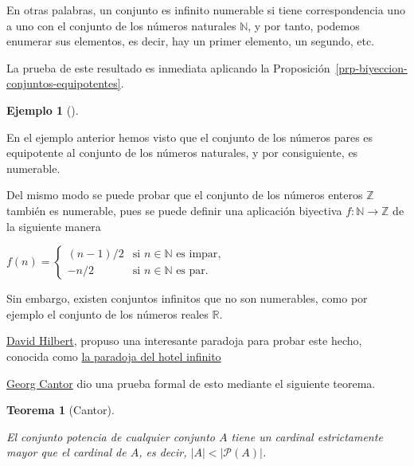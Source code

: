 \documentclass[
  a4paper,
]{scrreport}
\theoremstyle{plain}
\theoremstyle{plain}
\newtheorem{theorem}{Teorema}[chapter]
\theoremstyle{definition}
\theoremstyle{definition}
\newtheorem{example}{Ejemplo}[chapter]
\theoremstyle{plain}
\theoremstyle{definition}
\theoremstyle{remark}
\begin{document}
En otras palabras, un conjunto es infinito numerable si tiene
correspondencia uno a uno con el conjunto de los números naturales
\(\mathbb{N}\), y por tanto, podemos enumerar sus elementos, es decir,
hay un primer elemento, un segundo, etc.

La prueba de este resultado es inmediata aplicando la
Proposición~\ref{prp-biyeccion-conjuntos-equipotentes}.

\begin{example}[]\protect\hypertarget{exm-enteros-equipotentes-naturales}{}\label{exm-enteros-equipotentes-naturales}

En el ejemplo anterior hemos visto que el conjunto de los números pares
es equipotente al conjunto de los números naturales, y por consiguiente,
es numerable.

Del mismo modo se puede probar que el conjunto de los números enteros
\(\mathbb{Z}\) también es numerable, pues se puede definir una
aplicación biyectiva \(f:\mathbb{N}\rightarrow \mathbb{Z}\) de la
siguiente manera

\(f(n)= \begin{cases} (n-1)/2 &\mbox{si } n\in \mathbb{N} \mbox{ es impar},\\ -n/2 &\mbox{si } n\in \mathbb{N} \mbox{ es par}. \end{cases}\)

\end{example}

Sin embargo, existen conjuntos infinitos que no son numerables, como por
ejemplo el conjunto de los números reales \(\mathbb{R}\).

\href{https://es.wikipedia.org/wiki/David_Hilbert}{David Hilbert},
propuso una interesante paradoja para probar este hecho, conocida como
\href{https://www.youtube.com/watch?v=4c8vG-mxuao}{la paradoja del hotel
infinito}

\href{https://en.wikipedia.org/wiki/Georg_Cantor}{Georg Cantor} dio una
prueba formal de esto mediante el siguiente teorema.

\begin{theorem}[Cantor]\protect\hypertarget{thm-cantor}{}\label{thm-cantor}

El conjunto potencia de cualquier conjunto \(A\) tiene un cardinal
estrictamente mayor que el cardinal de \(A\), es decir,
\(|A| < |\mathcal{P}(A)|\).

\end{theorem}
\end{document}
